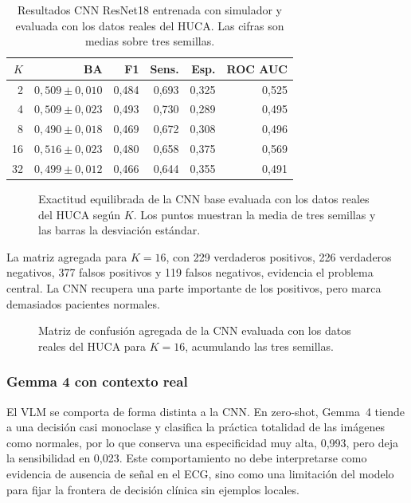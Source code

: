 \begin{table}[H]
  \centering
  \small
  \begin{tabular}{rrrrrr}
    \toprule
    \(K\) & BA & F1 & Sens. & Esp. & ROC AUC \\
    \midrule
    2  & \(0,509 \pm 0,010\) & 0,484 & 0,693 & 0,325 & 0,525 \\
    4  & \(0,509 \pm 0,023\) & 0,493 & 0,730 & 0,289 & 0,495 \\
    8  & \(0,490 \pm 0,018\) & 0,469 & 0,672 & 0,308 & 0,496 \\
    16 & \(0,516 \pm 0,023\) & 0,480 & 0,658 & 0,375 & 0,569 \\
    32 & \(0,499 \pm 0,012\) & 0,466 & 0,644 & 0,355 & 0,491 \\
    \bottomrule
  \end{tabular}
  \caption{Resultados CNN ResNet18 entrenada con simulador y evaluada con los datos reales del HUCA. Las cifras son medias sobre tres semillas.}
  \label{tab:huca_baseline_final}
\end{table}

\begin{figure}[H]
  \centering
  \caption{Exactitud equilibrada de la CNN base evaluada con los datos reales del HUCA según \(K\). Los puntos muestran la media de tres semillas y las barras la desviación estándar.}
  \label{fig:cnn_huca_ba}
\end{figure}

La matriz agregada para \(K=16\), con 229 verdaderos positivos, 226 verdaderos negativos, 377 falsos positivos y 119 falsos negativos, evidencia el problema central. La CNN recupera una parte importante de los positivos, pero marca demasiados pacientes normales.

\begin{figure}[H]
  \centering
  \caption{Matriz de confusión agregada de la CNN evaluada con los datos reales del HUCA para \(K=16\), acumulando las tres semillas.}
  \label{fig:cnn_huca_confusion}
\end{figure}

\subsubsection{Gemma 4 con contexto real}

El VLM se comporta de forma distinta a la CNN. En zero-shot, Gemma~4 tiende a una decisión casi monoclase y clasifica la práctica totalidad de las imágenes como normales, por lo que conserva una especificidad muy alta, 0,993, pero deja la sensibilidad en 0,023. Este comportamiento no debe interpretarse como evidencia de ausencia de señal en el ECG, sino como una limitación del modelo para fijar la frontera de decisión clínica sin ejemplos locales.

